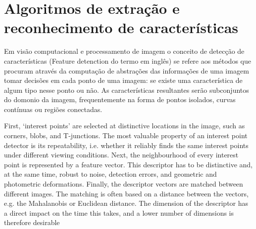 \chapter{Algoritmos de extração e reconhecimento de características}


Em visão computacional e processamento de imagem o conceito de detecção de
características (Feature detenction do termo em inglês) se refere aos
métodos que procuram através da computação de abstrações das informações de uma
imagem tomar decisões em cada ponto de uma imagem: se existe uma característica
de algum tipo nesse ponto ou não. As características resultantes serão
subconjuntos do domonio da imagem, frequentemente na forma de pontos isolados,
curvas contínuas ou regiões conectadas.

First, ‘interest points’ are selected at distinctive locations in the image,
such as corners, blobs, and T-junctions. The most valuable property of an
interest point detector is its repeatability, i.e. whether it reliably finds
the same interest points under different viewing conditions. Next, the
neighbourhood of every interest point is represented by a feature vector. This
descriptor has to be distinctive and, at the same time, robust to noise,
detection errors, and geometric and photometric deformations. Finally, the
descriptor vectors are matched between different images. The matching is often
based on a distance between the vectors, e.g. the Mahalanobis or Euclidean
distance. The dimension of the descriptor has a direct impact on the time this
takes, and a lower number of dimensions is therefore desirable

